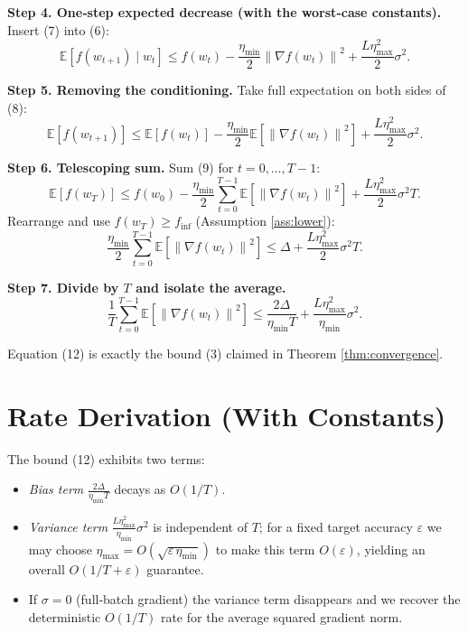 \documentclass{article}
\newcommand{\EE}{\mathbb{E}}
\newcommand{\norm}[1]{\left\lVert #1\right\rVert}
\begin{document}
\noindent\textbf{Step 4. One‑step expected decrease (with the worst‑case constants).}  
Insert (7) into (6):
\[
\EE\!\left[f(w_{t+1})\mid w_t\right]
\le f(w_t)-\frac{\eta_{\min}}{2}\norm{\nabla f(w_t)}^{2}
     +\frac{L\eta_{\max}^{2}}{2}\sigma^{2}. \tag{8}
\]

\noindent\textbf{Step 5. Removing the conditioning.}  
Take full expectation on both sides of (8):
\[
\EE\!\left[f(w_{t+1})\right]
\le \EE\!\left[f(w_t)\right]
    -\frac{\eta_{\min}}{2}\EE\!\left[\norm{\nabla f(w_t)}^{2}\right]
    +\frac{L\eta_{\max}^{2}}{2}\sigma^{2}. \tag{9}
\]

\noindent\textbf{Step 6. Telescoping sum.}  
Sum (9) for $t=0,\dots,T-1$:
\[
\EE\!\left[f(w_T)\right]
\le f(w_0)
    -\frac{\eta_{\min}}{2}\sum_{t=0}^{T-1}\EE\!\left[\norm{\nabla f(w_t)}^{2}\right]
    +\frac{L\eta_{\max}^{2}}{2}\sigma^{2}T . \tag{10}
\]
Rearrange and use $f(w_T)\ge f_{\inf}$ (Assumption \ref{ass:lower}):
\[
\frac{\eta_{\min}}{2}\sum_{t=0}^{T-1}\EE\!\left[\norm{\nabla f(w_t)}^{2}\right]
\le \Delta
   +\frac{L\eta_{\max}^{2}}{2}\sigma^{2}T .
\tag{11}
\]

\noindent\textbf{Step 7. Divide by $T$ and isolate the average.}
\[
\frac{1}{T}\sum_{t=0}^{T-1}\EE\!\left[\norm{\nabla f(w_t)}^{2}\right]
\le \frac{2\Delta}{\eta_{\min}T}
   + \frac{L\eta_{\max}^{2}}{\eta_{\min}}\sigma^{2}. \tag{12}
\]

Equation (12) is exactly the bound (3) claimed in Theorem \ref{thm:convergence}. \qedhere

\section*{Rate Derivation (With Constants)}
The bound (12) exhibits two terms:
\begin{itemize}
\item \emph{Bias term} $\displaystyle \frac{2\Delta}{\eta_{\min}T}$ decays as $O(1/T)$.
\item \emph{Variance term} $\displaystyle \frac{L\eta_{\max}^{2}}{\eta_{\min}}\sigma^{2}$ is independent of $T$; for a fixed target accuracy $\varepsilon$ we may choose $\eta_{\max}=O(\sqrt{\varepsilon\,\eta_{\min}})$ to make this term $O(\varepsilon)$, yielding an overall $O(1/T+\varepsilon)$ guarantee.
\item If $\sigma=0$ (full‑batch gradient) the variance term disappears and we recover the deterministic $O(1/T)$ rate for the average squared gradient norm.
\end{itemize}
\end{document}
